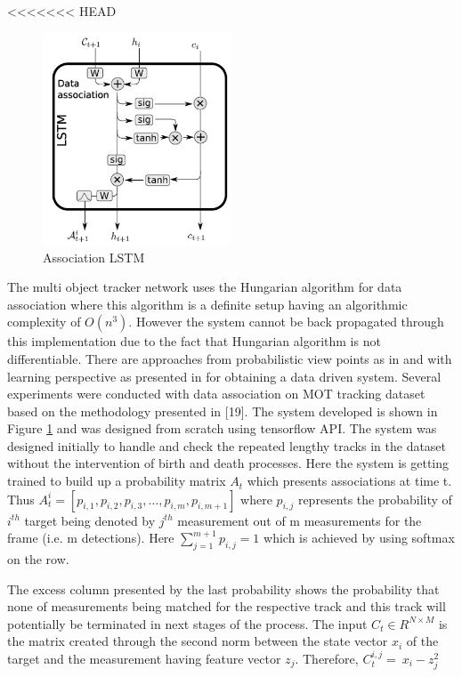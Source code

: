 <<<<<<< HEAD
\begin{figure}[t]
	\centering
	\includegraphics[width=0.5\textwidth]{figs/lstm_associate.png}
	\vspace{-0.3cm}
	\caption{Association LSTM}
	\label{fig:LSTM_association}
	\vspace{0.5cm}
\end{figure}

The multi object tracker network uses the Hungarian algorithm for data association where this algorithm is a definite setup having an algorithmic complexity of $O(n^3)$. However the system cannot be back propagated through this implementation due to the fact that Hungarian algorithm is not differentiable. There are approaches from probabilistic view points as in \cite{russel}  and with learning perspective as presented in \cite{DeepSiam:multitarget} for obtaining a data driven system. Several experiments were conducted with data association on MOT tracking dataset based on the methodology presented in [19]. The system developed is shown in Figure \ref{fig:LSTM_association} and was designed from scratch using tensorflow API. The system was designed initially to handle and check the repeated lengthy tracks in the dataset without the intervention of birth and death processes. Here the system is getting trained to build up a probability matrix $A_t$ which presents associations at time t. Thus $A_t^i=[p_{i,1},p_{i,2},p_{i,3},\ldots,p_{i,m},p_{i,m+1}]$ where  $p_{i,j}$ represents the probability of $i^{th}$  target being denoted by $j^{th}$ measurement out of m measurements for the frame (i.e. m detections).
Here 
$\sum_{j=1}^{m+1}p_{i,j}=1$ which is achieved by using softmax on the row.

The excess column presented by the last probability shows the probability that none of measurements being matched for the respective track and this track will potentially be terminated in next stages of the process.
The input $C_t\in R^{N\times M}$ is the matrix created through the second norm between the state vector $x_i$ of the target and the measurement having feature vector $z_j$.
Therefore, $C_t^{i,j}=\ x_i-z_j^2$

